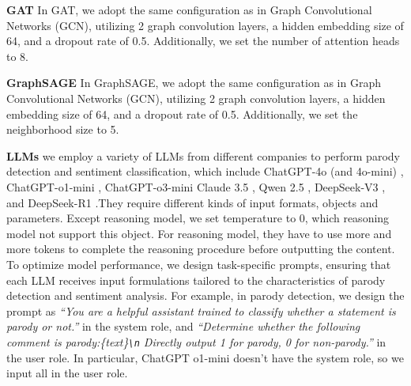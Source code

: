 \textbf{GAT} \citep{GAT}
In GAT, we adopt the same configuration as in Graph Convolutional Networks (GCN), utilizing 2 graph convolution layers, a hidden embedding size of 64, and a dropout rate of 0.5. Additionally, we set the number of attention heads to 8.

\textbf{GraphSAGE} \citep{GraphSAGE}
In GraphSAGE, we adopt the same configuration as in Graph Convolutional Networks (GCN), utilizing 2 graph convolution layers, a hidden embedding size of 64, and a dropout rate of 0.5. Additionally, we set the neighborhood size to 5.

\textbf{LLMs}
we employ a variety of LLMs from different companies to perform parody detection and sentiment classification, which include ChatGPT-4o (and 4o-mini) \citep{GPT4}, ChatGPT-o1-mini \citep{ChatGPT-o1}, ChatGPT-o3-mini \citep{ChatGPT-o3} Claude 3.5 \citep{Claude}, Qwen 2.5 \citep{Qwen2.5}, DeepSeek-V3 \citep{DeepSeek}, and DeepSeek-R1 \citep{DeepSeek-R1}.They require different kinds of input formats, objects and parameters. Except reasoning model, we set temperature to 0, which reasoning model not support this object. For reasoning model, they have to use more and more tokens to complete the reasoning procedure before outputting the content. To optimize model performance, we design task-specific prompts, ensuring that each LLM receives input formulations tailored to the characteristics of parody detection and sentiment analysis. For example, in parody detection, we design the prompt as \textit{``You are a helpful assistant trained to classify whether a statement is parody or not.''} in the system role, and \textit{``Determine whether the following comment is parody:\{text\}\texttt{\textbackslash n} Directly output 1 for parody, 0 for non-parody.''} in the user role. In particular, ChatGPT o1-mini doesn't have the system role, so we input all in the user role.





% 